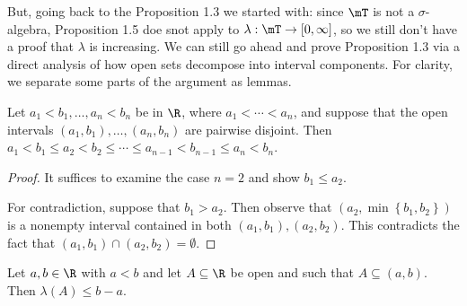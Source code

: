\documentclass[pmath450]{subfiles}
\begin{document}
    But, going back to the Proposition 1.3 we started with: since $\mT$ is not a $\sigma$-algebra, Proposition 1.5 doe snot apply to $\lambda:\mT\to\left[ 0,\infty \right]$, so we still don't have a proof that $\lambda$ is increasing. We can still go ahead and prove Proposition 1.3 via a direct analysis of how open sets decompose into interval components. For clarity, we separate some parts of the argument as lemmas.

    \begin{lemma}{}
        Let $a_1<b_1,\ldots,a_n<b_n$ be in $\R$, where $a_1<\cdots<a_n$, and suppose that the open intervals $\left( a_1,b_1 \right),\ldots,\left( a_n,b_n \right)$ are pairwise disjoint. Then $a_1<b_1\leq a_2<b_2\leq\cdots\leq a_{n-1}<b_{n-1}\leq a_n<b_n$.
    \end{lemma}
    
    \begin{proof}
        It suffices to examine the case $n=2$ and show $b_1\leq a_2$.

        For contradiction, suppose that $b_1>a_2$. Then observe that $\left( a_2,\min\left\lbrace b_1,b_2 \right\rbrace \right)$ is a nonempty interval contained in both $\left( a_1,b_1 \right),\left( a_2,b_2 \right)$. This contradicts the fact that $\left( a_1,b_1 \right)\cap\left( a_2,b_2 \right)=\emptyset$.
    \end{proof}

    \begin{lemma}{}
        Let $a,b\in\R$ with $a<b$ and let $A\subseteq\R$ be open and such that $A\subseteq\left( a,b \right)$. Then $\lambda\left( A \right)\leq b-a$.
    \end{lemma}
\end{document}
